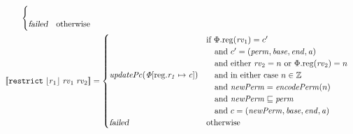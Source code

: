 \documentclass{article}
\newcommand{\update}[2]{[#1 \mapsto #2]}
\newcommand{\sem}[1]{\left\llbracket #1 \right\rrbracket}
\newcommand{\var}[1]{\mathit{#1}}
\newcommand{\rv}{\var{rv}}
\newcommand{\addr}{\var{a}}
\newcommand{\start}{\var{base}}
\newcommand{\addrend}{\var{end}}
\newcommand{\perm}{\var{perm}}
\newcommand{\stdcap}[1][\perm]{\left(#1,\start,\addrend,\addr \right)}
\newcommand{\plainproj}[1]{\mathrm{#1}}
\newcommand{\memreg}[1][\Phi]{#1.\plainproj{reg}}
\newcommand{\updateReg}[3][\Phi]{#1\update{\plainproj{reg}.#2}{#3}}
\newcommand{\failed}{\textsl{failed}}
\newcommand{\plainfun}[1]{\mathit{#1}}
\newcommand{\encodePerm}{\plainfun{encodePerm}}
\newcommand{\stdUpdatePc}[1]{\plainfun{updatePc(#1)}}
\newcommand{\ints}{\mathbb{Z}}
\newcommand{\refreg}[1]{\lfloor #1 \rfloor}
\newcommand{\instr}[1]{\mathtt{#1}}
\newcommand{\threeinstr}[4]{\instr{#1} \; #2 \; #3 \; #4}
\newcommand{\restrict}[3]{\threeinstr{restrict}{#1}{#2}{#3}}
\begin{document}
\begin{align*}
\begin{cases}
\begin{array}{l}
                                                 \end{array}\\
                                               \failed               & \text{otherwise}
                                             \end{cases} 
\\
  \sem{\restrict{\refreg{r_1}}{\rv_1}{\rv_2}}           & =
                                             \begin{cases}
                                               \stdUpdatePc{\updateReg{r_1}{\var{c}}}  &
                                                 \arraycolsep=0pt
                                                 \begin{array}{l}
                                                   \text{if $\memreg(\rv_1) = c'$}\\
                                                   \quad\text{and $c' = \stdcap$}\\
                                                   \quad\text{and either $\rv_2 = n$ or $\memreg(\rv_2) = n$}\\
                                                   \quad\text{and in either case $n \in \ints$}\\
                                                   \quad\text{and $\var{newPerm} = \encodePerm(n)$}\\
                                                   \quad\text{and $\var{newPerm} \sqsubseteq \perm$}\\
                                                   \quad\text{and $c = (\var{newPerm},\start,\addrend,\addr)$}
                                                 \end{array}\\
                                               \failed                   & \text{otherwise}
                                             \end{cases} 
\end{align*}
\end{document}
